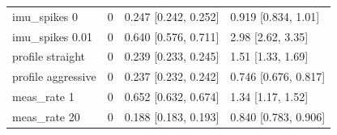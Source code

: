 {\begin{longtable}{llll}
imu\_spikes 0 & 0 & 0.247 [0.242, 0.252] & 0.919 [0.834, 1.01] \\
imu\_spikes 0.01 & 0 & 0.640 [0.576, 0.711] & 2.98 [2.62, 3.35] \\
profile straight & 0 & 0.239 [0.233, 0.245] & 1.51 [1.33, 1.69] \\
profile aggressive & 0 & 0.237 [0.232, 0.242] & 0.746 [0.676, 0.817] \\
meas\_rate 1 & 0 & 0.652 [0.632, 0.674] & 1.34 [1.17, 1.52] \\
meas\_rate 20 & 0 & 0.188 [0.183, 0.193] & 0.840 [0.783, 0.906] \\
\bottomrule
\end{longtable}
}
